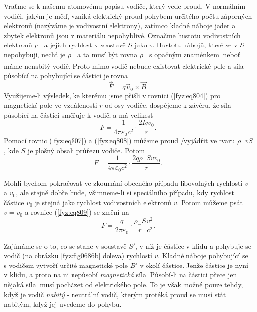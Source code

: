     Vraťme se k našemu atomovému popisu vodiče, který vede proud. V normálním vodiči, jakým je měď,
    vzniká elektrický proud pohybem určitého počtu záporných elektronů (nazýváme je vodivostní
    elektrony), zatímco kladné náboje jader a zbytek elektronů jsou v materiálu nepohyblivé. Označme
    hustotu vodivostních elektronů \( ρ_−\) a jejich rychlost v soustavě \(S\) jako \(v\). Hustota
    nábojů, které se v \(S\) nepohybují, nechť je \( ρ_+\) a ta musí být rovna \( ρ_−\) s opačným
    znaménkem, neboť  máme nenabitý vodič. Proto mimo vodič nebude existovat elektrické pole a síla
    působící na pohybující se částici je rovna
    \begin{equation*}
      \vec{F}=q\vec{v}_0\times\vec{B}.
    \end{equation*}
    Využijeme-li výsledek, ke kterému jsme přišli v rovnici (\ref{fyz:eq804}) pro magnetické pole ve
    vzdálenosti \(r\) od osy vodiče, dospějeme k závěru, že síla působící na částici směřuje k
    vodiči a má velikost
    \begin{equation*}
      F=\dfrac{1}{4π\varepsilon_0c^2}\cdot\dfrac{2Iqv_0}{r}.
    \end{equation*}
    Pomocí rovnic (\ref{fyz:eq807}) a (\ref{fyz:eq808}) můžeme proud /vyjádřit ve tvaru
    \(ρ_−vS\), kde \(S\) je plošný obsah průřezu vodiče. Potom
    \begin{equation}\label{fyz:eq809}
      F=\dfrac{1}{4π\varepsilon_0c^2}\cdot\dfrac{2qρ_−Svv_0}{r}.
    \end{equation}

    Mohli bychom pokračovat ve zkoumání obecného případu libovolných rychlostí \(v\) a \(v_0\), ale
    stejně dobře bude, všimneme-li si speciálního případu, kdy rychlost částice \(v_0\) je stejná
    jako rychlost vodivostních elektronů \(v\). Potom můžeme psát \(v=v_0\) a rovnice
    (\ref{fyz:eq809}) se změní na
    \begin{equation}\label{fyz:eq810}
      F=\dfrac{q}{2π\varepsilon_0}\cdot\dfrac{ρ_−S}{r}\dfrac{v^2}{c^2}.
    \end{equation}

    Zajímáme se o to, co se stane v soustavě \(S'\), v níž je částice v klidu a pohybuje se vodič
    (na  obrázku \ref{fyz:fig0686b} doleva) rychlostí \(v\). Kladné náboje pohybující se s vodičem
    vytvoří určité magnetické pole  \(B'\) v okolí částice. Jenže částice je nyní v klidu, a proto
    na ni nepůsobí \emph{magnetická} síla! Působí-li na částici přece jen nějaká síla, musí pocházet
    od elektrického pole. To je však možné pouze tehdy, když je vodič \emph{nabitý} - neutrální
    vodič, kterým protéká proud se musí stát nabitým, když jej uvedeme do pohybu.


